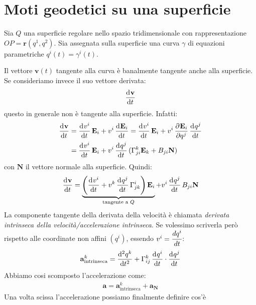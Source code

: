 \section{Moti geodetici su una superficie}
Sia $Q$ una superficie regolare nello spazio tridimensionale con rappresentazione $OP=\mathbf{r}(q^1,q^2)$. Sia assegnata sulla superficie una curva $\gamma$ di equazioni parametriche $q^i(t)=\gamma^i(t)$.

Il vettore $\mathbf{v}(t)$ tangente alla curva è banalmente tangente anche alla superficie. Se consideriamo invece il suo vettore derivata:
\begin{align*}
    \dod{\mathbf{v}}{t}
\end{align*}
questo in generale non è tangente alla superficie. Infatti:
\begin{align*}
   \dod{\mathbf{v}}{t} &=\dod{v^i}{t}\mathbf{E}_i+v^i\dod{\mathbf{E}_i}{t}=\dod{v^i}{t}\mathbf{E}_i+v^i\dpd{\mathbf{E}_i}{{q^j}}\dod{q^j}{t}\\
   &=\dod{v^i}{t}\mathbf{E}_i+v^i\dod{q^j}{t}(\Gamma_{ji}^k\mathbf{E}_k+B_{ji}\mathbf{N})
\end{align*}
con $\mathbf{N}$ il vettore normale alla superficie. Quindi:
\begin{align*}
    \dod{\mathbf{v}}{t}=\underbrace{\left(\dod{v^i}{t}+v^k\dod{q^j}{t}\Gamma^i_{jk}\right)\mathbf{E}_i}_{\text{tangente a }Q}+v^i\dod{q^j}{t}B_{ji}\mathbf{N}
\end{align*}
La componente tangente della derivata della velocità è chiamata \emph{derivata intrinseca della velocità/accelerazione intrinseca}. Se volessimo scriverla però rispetto alle coordinate non affini $(q^i)$, essendo $v^i=\cfrac{dq^i}{dt}$: %
\begin{align*}
    \mathbf{a}^k_{\text{intrinseca}}=\dod[2]{q^k}{t}+\Gamma^k_{ij}\dod{q^i}{t}\cdot \dod{q^j}{t}
\end{align*}
Abbiamo cosi scomposto l'accelerazione come:
\begin{align*}
    \mathbf{a}=\mathbf{a}^k_{\text{intrinseca}}+\mathbf{a}_{\mathbf{N}}
\end{align*}
Una volta scissa l'accelerazione possiamo finalmente definire cos'è 

